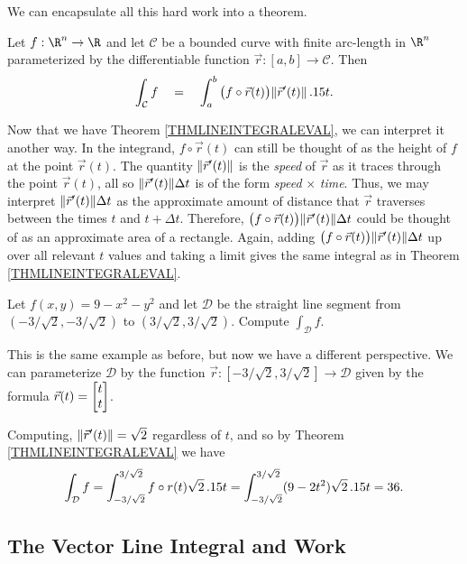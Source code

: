 We can encapsulate all this hard work into a theorem.

\begin{theorem}
	\label{THMLINEINTEGRALEVAL}
	Let $f:\R^n\to \R$ and let $\mathcal C$ be a bounded curve with finite
	arc-length
	in $\R^n$ parameterized by the differentiable function $\vec r:[a,b]\to\mathcal C$.  
	Then
	\[
		\int_{\mathcal C} f \quad=\quad \int_{a}^b \big(f\circ \vec r(t)\big)\lVert\vec r'(t)\rVert\,.15 t.
	\]
\end{theorem}

Now that we have Theorem \ref{THMLINEINTEGRALEVAL}, we can interpret it another way.
In the integrand, $f\circ \vec r(t)$ can still be thought of as the height of
$f$ at the point $\vec r(t)$.  The quantity $\lVert\vec r'(t)\rVert$
is the \emph{speed} of $\vec r$ as it traces through the point $\vec r(t)$,
all so $\lVert\vec r'(t)\rVert\Delta t$ is of the form \emph{speed}$\,\times\,$\emph{time}.
Thus, we may interpret $\lVert\vec r'(t)\rVert\Delta t$ as the approximate amount of distance
that $\vec r$ traverses between the times $t$ and $t+\Delta t$.  Therefore, 
$\big(f\circ \vec r(t)\big)\lVert\vec r'(t)\rVert\Delta t$ could be thought of as an approximate
area of a rectangle.  Again, adding $\big(f\circ \vec r(t)\big)\lVert\vec r'(t)\rVert\Delta t$ up
over all relevant $t$ values and taking a limit gives 
the same integral as in Theorem \ref{THMLINEINTEGRALEVAL}.

\begin{example}
	Let $f(x,y) = 9-x^2-y^2$ and let $\mathcal D$ be the straight line segment
	from $(-3/\sqrt{2},-3/\sqrt{2})$ to $(3/\sqrt{2},3/\sqrt{2})$.  Compute
	$\int_{\mathcal D} f$.

	This is the same example as before, but now we have a different perspective.
	We can parameterize $\mathcal D$ by the function $\vec r:[-3/\sqrt{2},3/\sqrt{2}]\to
	\mathcal D$ given by the formula $\vec r(t)=\mat{t\\t}$.

	Computing, $\lVert\vec r'(t)\rVert = \sqrt{2}$ regardless of $t$, and so by Theorem
	\ref{THMLINEINTEGRALEVAL} we have
	\[
		\int_{\mathcal D} f = \int_{-3/\sqrt{2}}^{3/\sqrt{2}} f\circ r(t)\sqrt{2}\,.15 t
		=\int_{-3/\sqrt{2}}^{3/\sqrt{2}} (9-2t^2)\sqrt{2}\,.15 t = 36.
	\]
\end{example}


\subsection{The Vector Line Integral and Work}

